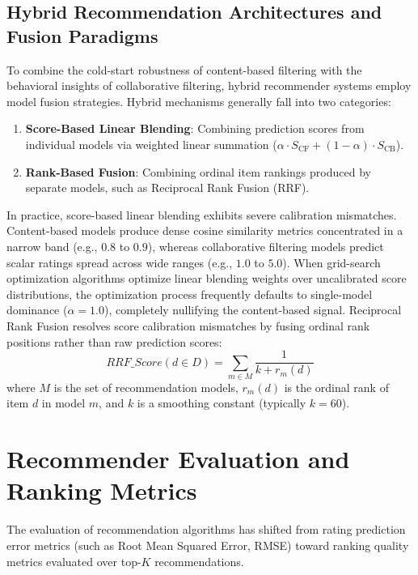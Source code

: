 \subsection{Hybrid Recommendation Architectures and Fusion Paradigms}
To combine the cold-start robustness of content-based filtering with the behavioral insights of collaborative filtering, hybrid recommender systems employ model fusion strategies. Hybrid mechanisms generally fall into two categories:
\begin{enumerate}
    \item \textbf{Score-Based Linear Blending}: Combining prediction scores from individual models via weighted linear summation ($\alpha \cdot S_{\text{CF}} + (1-\alpha) \cdot S_{\text{CB}}$).
    \item \textbf{Rank-Based Fusion}: Combining ordinal item rankings produced by separate models, such as Reciprocal Rank Fusion (RRF).
\end{enumerate}
In practice, score-based linear blending exhibits severe calibration mismatches. Content-based models produce dense cosine similarity metrics concentrated in a narrow band (e.g., $0.8$ to $0.9$), whereas collaborative filtering models predict scalar ratings spread across wide ranges (e.g., $1.0$ to $5.0$). When grid-search optimization algorithms optimize linear blending weights over uncalibrated score distributions, the optimization process frequently defaults to single-model dominance ($\alpha=1.0$), completely nullifying the content-based signal. Reciprocal Rank Fusion resolves score calibration mismatches by fusing ordinal rank positions rather than raw prediction scores:
\begin{equation}\label{eq:rrf}
RRF\_Score(d \in D) = \sum_{m \in M} \frac{1}{k + r_m(d)}
\end{equation}
where $M$ is the set of recommendation models, $r_m(d)$ is the ordinal rank of item $d$ in model $m$, and $k$ is a smoothing constant (typically $k=60$).

\section{Recommender Evaluation and Ranking Metrics}
The evaluation of recommendation algorithms has shifted from rating prediction error metrics (such as Root Mean Squared Error, RMSE) toward ranking quality metrics evaluated over top-$K$ recommendations.

